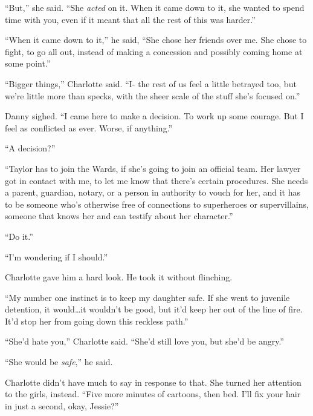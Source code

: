 ``But,'' she said.  ``She \emph{acted} on it.  When it came down to it, she wanted to spend time with you, even if it meant that all the rest of this was harder.''



``When it came down to it,'' he said, ``She chose her friends over me.  She chose to fight, to go all out, instead of making a concession and possibly coming home at some point.''



``Bigger things,'' Charlotte said.  ``I- the rest of us\emph{ }feel a little betrayed too, but we're little more than specks, with the sheer scale of the stuff she's focused on.''



Danny sighed.  ``I came here to make a decision.  To work up some courage.  But I feel as conflicted as ever.  Worse, if anything.''



``A decision?''



``Taylor has to join the Wards, if she's going to join an official team.  Her lawyer got in contact with me, to let me know that there's certain procedures.  She needs a parent, guardian, notary, or a person in authority to vouch for her, and it has to be someone who's otherwise free of connections to superheroes or supervillains, someone that knows her and can testify about her character.''



``Do it.''



``I'm wondering if I should.''



Charlotte gave him a hard look.  He took it without flinching.



``My number one instinct is to keep my daughter safe.  If she went to juvenile detention, it would\ldots it wouldn't be good, but it'd keep her out of the line of fire.  It'd stop her from going down this reckless path.''



``She'd hate you,'' Charlotte said.  ``She'd still love you, but she'd be angry.''



``She would be \emph{safe},'' he said.



Charlotte didn't have much to say in response to that.  She turned her attention to the girls, instead.  ``Five more minutes of cartoons, then bed.  I'll fix your hair in just a second, okay, Jessie?''



